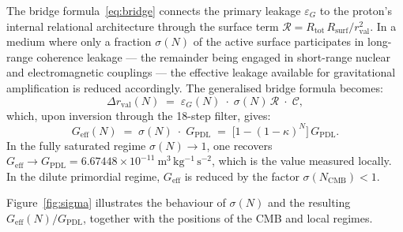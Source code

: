 \documentclass[11pt,a4paper]{article}
\theoremstyle{definition}
\newcommand{\Rsurf}{R_{\mathrm{surf}}}
\newcommand{\Rtot}{R_{\mathrm{tot}}}
\newcommand{\rval}{r_{\mathrm{val}}}
\newcommand{\epsg}{\varepsilon_G}
\newcommand{\calR}{\mathcal{R}}
\newcommand{\calC}{\mathcal{C}}
\newcommand{\Geff}{G_{\mathrm{eff}}}
\newcommand{\GPDL}{G_{\mathrm{PDL}}}
\newcommand{\kap}{\kappa}
\newcommand{\sig}{\sigma}
\begin{document}
The bridge formula~\eqref{eq:bridge} connects the primary leakage $\epsg$ to the proton's internal relational architecture through the surface term $\calR = \Rtot\,\Rsurf/\rval^2$. In a medium where only a fraction $\sig(N)$ of the active surface participates in long-range coherence leakage --- the remainder being engaged in short-range nuclear and electromagnetic couplings --- the effective leakage available for gravitational amplification is reduced accordingly. The generalised bridge formula becomes:
\begin{equation}
  \label{eq:bridge_N}
  \Delta\rval(N) \;=\; \epsg(N) \;\cdot\; \sig(N)\,\calR \;\cdot\; \calC,
\end{equation}
which, upon inversion through the 18-step filter, gives:
\begin{equation}
  \label{eq:Geff_N}
  \boxed{\Geff(N) \;=\; \sig(N) \;\cdot\; \GPDL \;=\; \bigl[1-(1-\kap)^N\bigr]\,\GPDL.}
\end{equation}
In the fully saturated regime $\sig(N) \to 1$, one recovers $\Geff \to \GPDL = 6.67448\times 10^{-11}\ \mathrm{m^3\,kg^{-1}\,s^{-2}}$, which is the value measured locally. In the dilute primordial regime, $\Geff$ is reduced by the factor $\sig(N_{\mathrm{CMB}}) < 1$.

Figure~\ref{fig:sigma} illustrates the behaviour of $\sig(N)$ and the resulting $\Geff(N)/\GPDL$, together with the positions of the CMB and local regimes.
\end{document}
